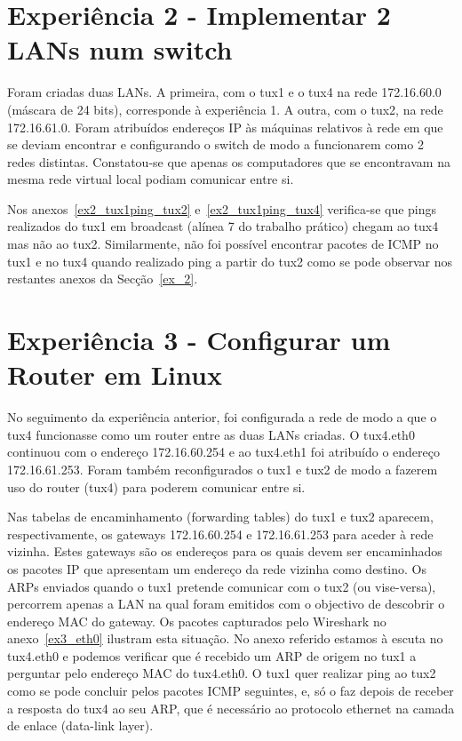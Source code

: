\documentclass[11pt,a4paper,reqno]{report}
\numberwithin{equation}{section}
\begin{document}
\section{Experiência 2 - Implementar 2 LANs num switch}

Foram criadas duas LANs. A primeira, com o tux1 e o tux4 na rede 172.16.60.0 (máscara de 24 bits), corresponde à experiência 1. A outra, com o tux2, na rede 172.16.61.0. Foram atribuídos endereços IP às máquinas relativos à rede em que se deviam encontrar e configurando o switch de modo a funcionarem como 2 redes distintas. Constatou-se que apenas os computadores que se encontravam na mesma rede virtual local podiam comunicar entre si. 

Nos anexos~\ref{ex2_tux1ping_tux2} e~\ref{ex2_tux1ping_tux4} verifica-se que pings realizados do tux1 em broadcast (alínea 7 do trabalho prático) chegam ao tux4 mas não ao tux2. Similarmente, não foi possível encontrar pacotes de ICMP no tux1 e no tux4 quando realizado ping a partir do tux2 como se pode observar nos restantes anexos da Secção~\ref{ex_2}.

\section{Experiência 3 - Configurar um Router em Linux}

No seguimento da experiência anterior, foi configurada a rede de modo a que o tux4 funcionasse como um router entre as duas LANs criadas. O tux4.eth0 continuou com o endereço 172.16.60.254 e ao tux4.eth1 foi atribuído o endereço 172.16.61.253. Foram também reconfigurados o tux1 e tux2 de modo a fazerem uso do router (tux4) para poderem comunicar entre si.

Nas tabelas de encaminhamento (forwarding tables) do tux1 e tux2 aparecem, respectivamente, os gateways 172.16.60.254 e 172.16.61.253 para aceder à rede vizinha. Estes gateways são os endereços para os quais devem ser encaminhados os pacotes IP que apresentam um endereço da rede vizinha como destino. Os ARPs enviados quando o tux1 pretende comunicar com o tux2 (ou vise-versa), percorrem apenas a LAN na qual foram emitidos com o objectivo de descobrir o endereço MAC do gateway. Os pacotes capturados pelo Wireshark no anexo~\ref{ex3_eth0} ilustram esta situação. No anexo referido estamos à escuta no tux4.eth0 e podemos verificar que é recebido um ARP de origem no tux1 a perguntar pelo endereço MAC do tux4.eth0. O tux1 quer realizar ping ao tux2 como se pode concluir pelos pacotes ICMP seguintes, e, só o faz depois de receber a resposta do tux4 ao seu ARP, que é necessário ao protocolo ethernet na camada de enlace (data-link layer).
\end{document}
